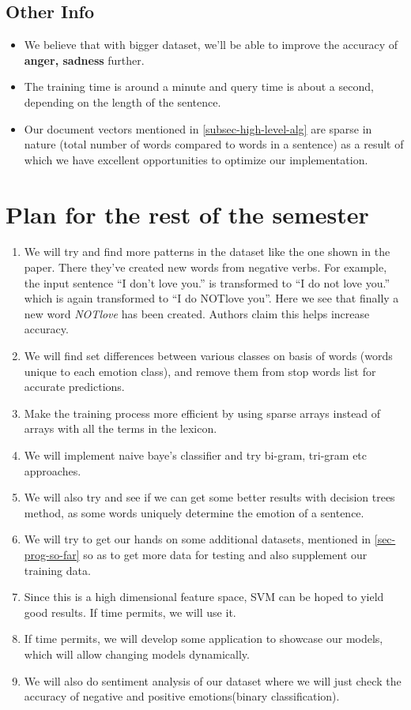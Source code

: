 \subsection{Other Info}
\begin{itemize}
 \item We believe that with bigger dataset, we'll be able to improve the accuracy of \textbf{anger, sadness} further.
 \item The training time is around a minute and query time is about a second, depending on the length of the sentence.
 \item Our document vectors mentioned in \ref{subsec-high-level-alg} are sparse in nature (total number of words compared to words in a sentence) as a result of which we have excellent opportunities to optimize our implementation.
\end{itemize}
\section{Plan for the rest of the semester}
\label{sec-plan-for-sem}
\begin{enumerate}
 \item We will try and find more patterns in the dataset like the one shown in the paper. There they've created new words from negative verbs. For example, the input sentence ``I don't love you.'' is transformed to ``I do not love you.'' which is again transformed to ``I do NOTlove you''. Here we see that finally a new word \emph{NOTlove} has been created. Authors claim this helps increase accuracy.
 \item We will find set differences between various classes on basis of words (words unique to each emotion class), and remove them from stop words list for accurate predictions.
 \item Make the training process more efficient by using sparse arrays instead of arrays with all the terms in the lexicon.
 \item We will implement naive baye's classifier and try bi-gram, tri-gram etc approaches.
 \item We will also try and see if we can get some better results with decision trees method, as some words uniquely determine the emotion of a sentence.
 \item We will try to get our hands on some additional datasets, mentioned in \ref{sec-prog-so-far} so as to get more data for testing and also supplement our training data.
 \item Since this is a high dimensional feature space, SVM can be hoped to yield good results. If time permits, we will use it.
 \item If time permits, we will develop some application to showcase our models, which will allow changing models dynamically.
 \item We will also do sentiment analysis of our dataset where we will just check the accuracy of negative and positive emotions(binary classification).
\end{enumerate}
